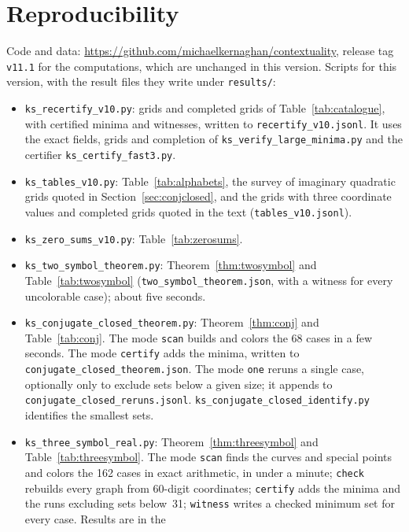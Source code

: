 \section{Reproducibility}\label{app:repro}

Code and data: \url{https://github.com/michaelkernaghan/contextuality}, release tag
\texttt{v11.1} for the computations, which are unchanged in this version.  Scripts for this
version, with the result files they write under \texttt{results/}:

\begin{itemize}\setlength{\itemsep}{0pt}
\item \texttt{ks\_recertify\_v10.py}: grids and completed grids of Table~\ref{tab:catalogue}, with certified minima
and witnesses, written to \texttt{recertify\_v10.jsonl}.  It uses the exact fields, grids and
completion of \texttt{ks\_verify\_large\_minima.py} and the certifier
\texttt{ks\_certify\_fast3.py}.
\item \texttt{ks\_tables\_v10.py}: Table~\ref{tab:alphabets}, the survey of imaginary quadratic
grids quoted in Section~\ref{sec:conjclosed}, and the grids with three coordinate values and completed grids
quoted in the text (\texttt{tables\_v10.jsonl}).
\item \texttt{ks\_zero\_sums\_v10.py}: Table~\ref{tab:zerosums}.
\item \texttt{ks\_two\_symbol\_theorem.py}: Theorem~\ref{thm:twosymbol} and
Table~\ref{tab:twosymbol} (\texttt{two\_symbol\_theorem.json}, with a witness for every
uncolorable case); about five seconds.
\item \texttt{ks\_conjugate\_closed\_theorem.py}: Theorem~\ref{thm:conj} and
Table~\ref{tab:conj}.  The mode \texttt{scan} builds and colors the 68 cases in a few seconds.
The mode \texttt{certify} adds the minima, written to
\texttt{conjugate\_closed\_theorem.json}.  The mode \texttt{one} reruns a single case,
optionally only to exclude sets below a given size; it appends to
\texttt{conjugate\_closed\_reruns.jsonl}.  \texttt{ks\_conjugate\_closed\_identify.py}
identifies the smallest sets.
\item \texttt{ks\_three\_symbol\_real.py}: Theorem~\ref{thm:threesymbol} and
Table~\ref{tab:threesymbol}.  The mode \texttt{scan} finds the curves and special points and
colors the 162 cases in exact arithmetic, in under a minute; \texttt{check} rebuilds every
graph from 60-digit coordinates; \texttt{certify} adds the minima and the runs excluding sets
below~31; \texttt{witness} writes a checked minimum set for every case.  Results are in the

\end{itemize}
